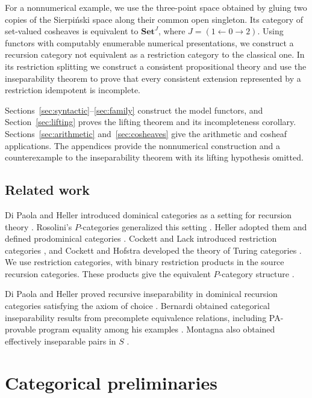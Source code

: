 \documentclass[11pt]{article}
\begin{document}
For a nonnumerical example, we use the three-point space obtained by
gluing two copies of the Sierpi\'nski space along their common open
singleton. Its category of set-valued cosheaves is equivalent to
$\mathbf{Set}^{J}$, where $J=(1\leftarrow0\to2)$. Using functors
with computably enumerable numerical presentations,
we construct a recursion category not equivalent as a restriction
category to the classical one. In its restriction splitting we construct
a consistent propositional theory and use the inseparability theorem
to prove that every consistent extension represented by a restriction
idempotent is incomplete.

Sections~\ref{sec:syntactic}--\ref{sec:family} construct the model
functors, and Section~\ref{sec:lifting} proves the lifting theorem and
its incompleteness corollary. Sections~\ref{sec:arithmetic}
and~\ref{sec:cosheaves} give the arithmetic and cosheaf applications.
The appendices provide the nonnumerical construction and a counterexample
to the inseparability theorem with its lifting hypothesis omitted.

\subsection{Related work}

Di Paola and Heller introduced dominical categories as a setting for
recursion theory \cite{DPH}. Rosolini's $P$-categories generalized this
setting \cite{RosoliniThesis,Rosolini}. Heller adopted them and defined
prodominical categories \cite[Section 5]{Heller}.
Cockett and Lack introduced restriction categories \cite{CockettLack},
and Cockett and Hofstra developed the theory of Turing categories
\cite{CockettHofstra}. We use restriction categories, with binary
restriction products in the source recursion categories. These products
give the equivalent $P$-category structure
\cite[Proposition 4.5]{CockettLackIII}.

Di Paola and Heller proved recursive inseparability in dominical
recursion categories satisfying the axiom of choice
\cite[Theorem 8.15]{DPH}. Bernardi obtained categorical inseparability
results from precomplete equivalence relations, including PA-provable
program equality among his examples \cite[pp.~125--128]{Bernardi}.
Montagna also obtained effectively inseparable pairs in $S$
\cite[Remark 3.1]{Montagna}.

\section{Categorical preliminaries}\label{sec:preliminaries}
\end{document}
